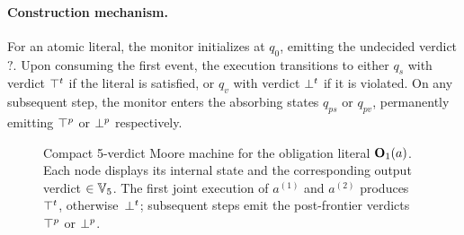 \paragraph{Construction mechanism.} For an atomic literal, the monitor initializes at $q_0$, emitting the undecided verdict $\mathsf{?}$.
Upon consuming the first event, the execution transitions to either $q_s$ with verdict $\topt$ if the literal is satisfied, or $q_v$ with verdict $\bott$ if it is violated.
On any subsequent step, the monitor enters the absorbing states $q_{ps}$ or $q_{pv}$, permanently emitting $\topp$ or $\botp$ respectively.

\begin{figure}[h!]
\centering
{}
\caption{Compact 5-verdict Moore machine for the obligation literal
$\obl[1]{a}$. 
Each node displays its internal state and the corresponding output verdict $\in\tightverdicts$.
The first joint execution of $a^{(1)}$ and $a^{(2)}$ produces~$\topt$,
otherwise~$\bott$; subsequent steps emit the post-frontier verdicts
$\topp$ or $\botp$.}
\label{fig:moore-obligation-compact}
\end{figure}


